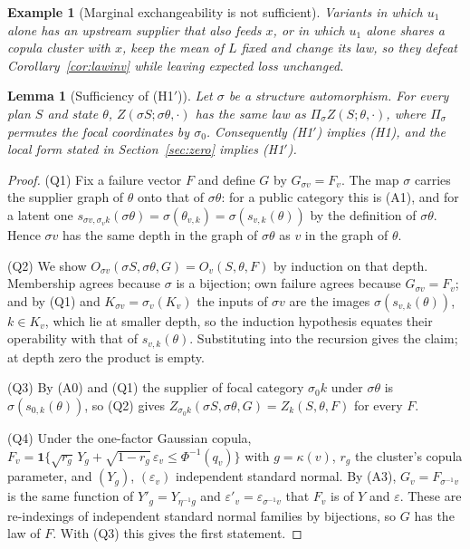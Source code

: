 \documentclass[pdflatex,sn-mathphys-num]{sn-jnl}
\theoremstyle{thmstyleone}
\newtheorem{lemma}[theorem]{Lemma}
\theoremstyle{thmstyletwo}
\newtheorem{example}{Example}
\theoremstyle{thmstylethree}
\begin{document}
\begin{appendices}
\begin{example}[Marginal exchangeability is not sufficient]
Variants in which $u_1$ alone has an upstream supplier that also feeds $x$,
or in which $u_1$ alone shares a copula cluster with $x$, keep the mean of
$L$ fixed and change its law, so they defeat Corollary~\ref{cor:lawinv}
while leaving expected loss unchanged.
\end{example}

\begin{lemma}[Sufficiency of (H1$'$)]\label{lem:H1suff}
Let $\sigma$ be a structure automorphism. For every plan $S$ and state
$\theta$, $Z(\sigma S;\sigma\theta,\cdot)$ has the same law as
$\Pi_{\sigma}Z(S;\theta,\cdot)$, where $\Pi_\sigma$ permutes the focal
coordinates by $\sigma_0$. Consequently (H1$'$) implies (H1), and the local
form stated in Section~\ref{sec:zero} implies (H1$'$).
\end{lemma}

\begin{proof}
(Q1) Fix a failure vector $F$ and define $G$ by $G_{\sigma v}=F_v$. The map
$\sigma$ carries the supplier graph of $\theta$ onto that of $\sigma\theta$:
for a public category this is (A1), and for a latent one
$s_{\sigma v,\sigma_vk}(\sigma\theta)=\sigma(\theta_{v,k})
=\sigma(s_{v,k}(\theta))$ by the definition of $\sigma\theta$. Hence $\sigma v$
has the same depth in the graph of $\sigma\theta$ as $v$ in the graph of
$\theta$.

\noindent(Q2) We show $O_{\sigma v}(\sigma S,\sigma\theta,G)
=O_v(S,\theta,F)$ by induction on that depth. Membership agrees because
$\sigma$ is a bijection; own failure agrees because $G_{\sigma v}=F_v$; and by
(Q1) and $K_{\sigma v}=\sigma_v(K_v)$ the inputs of $\sigma v$ are the images
$\sigma(s_{v,k}(\theta))$, $k\in K_v$, which lie at smaller depth, so the
induction hypothesis equates their operability with that of
$s_{v,k}(\theta)$. Substituting into the recursion gives the claim; at depth
zero the product is empty.

\noindent(Q3) By (A0) and (Q1) the supplier of focal category $\sigma_0k$
under $\sigma\theta$ is $\sigma(s_{0,k}(\theta))$, so (Q2) gives
$Z_{\sigma_0k}(\sigma S,\sigma\theta,G)=Z_k(S,\theta,F)$ for every $F$.

\noindent(Q4) Under the one-factor Gaussian copula,
$F_v=\mathbf 1\{\sqrt{r_g}\,Y_g+\sqrt{1-r_g}\,\varepsilon_v\le
\Phi^{-1}(q_v)\}$ with $g=\kappa(v)$, $r_g$ the cluster's copula parameter,
and $(Y_g)$, $(\varepsilon_v)$ independent standard normal. By (A3),
$G_v=F_{\sigma^{-1}v}$ is the same function of $Y'_g=Y_{\eta^{-1}g}$ and
$\varepsilon'_v=\varepsilon_{\sigma^{-1}v}$ that $F_v$ is of $Y$ and
$\varepsilon$. These are re-indexings of independent standard normal families
by bijections, so $G$ has the law of $F$. With (Q3) this gives the first
statement.


\end{proof}
\end{appendices}
\end{document}
